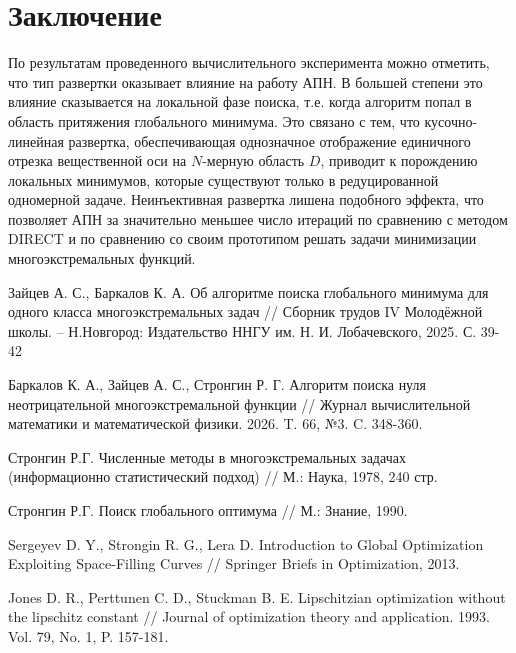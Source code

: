 \documentclass[11pt, oneside, a4paper]{article}
\begin{document}
\section{Заключение}
По результатам проведенного вычислительного эксперимента можно отметить, что тип развертки оказывает влияние на работу АПН. В большей степени это влияние сказывается на локальной фазе поиска, т.е. когда алгоритм попал в область притяжения глобального минимума. Это связано с тем, что кусочно-линейная развертка, обеспечивающая однозначное отображение единичного отрезка вещественной оси на $N$-мерную область $D$, приводит к порождению локальных минимумов, которые существуют только в редуцированной одномерной задаче. Неинъективная развертка лишена подобного эффекта, что позволяет АПН за значительно меньшее число итераций по сравнению с методом DIRECT и по сравнению со своим прототипом решать задачи минимизации многоэкстремальных функций.

\begin{biblio}

Зайцев А. С., Баркалов К. А. Об алгоритме поиска глобального минимума для одного класса многоэкстремальных задач // Сборник трудов IV Молодёжной школы. -- Н.Новгород: Издательство ННГУ им. Н. И. Лобачевского, 2025. С. 39-42

Баркалов К. А., Зайцев А. С., Стронгин Р. Г. Алгоритм поиска нуля неотрицательной многоэкстремальной функции // Журнал вычислительной математики и математической физики. 2026. T. 66, №3. C. 348-360.

Стронгин Р.Г. Численные методы в многоэкстремальных задачах (информационно статистический подход) // М.: Наука, 1978, 240 стр.

Стронгин Р.Г. Поиск глобального оптимума // М.: Знание, 1990.


Sergeyev D. Y., Strongin R. G., Lera D. Introduction to Global Optimization Exploiting Space-Filling Curves // Springer Briefs in Optimization, 2013.

Jones D. R., Perttunen C. D., Stuckman B. E. Lipschitzian optimization without the lipschitz constant // Journal of optimization theory and application. 1993. Vol. 79, No. 1, P. 157-181.

\end{biblio}
\end{document}
